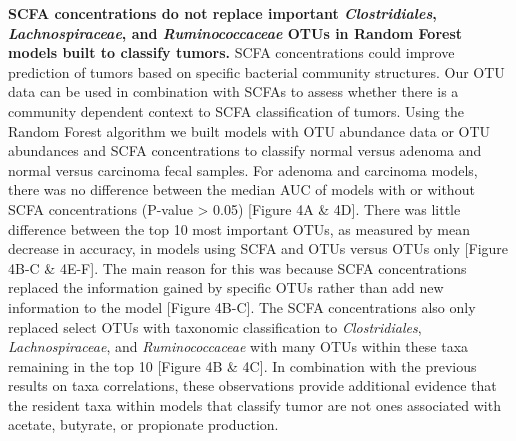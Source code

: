 \documentclass[11pt,]{article}
\begin{document}
\textbf{SCFA concentrations do not replace important
\emph{Clostridiales}, \emph{Lachnospiraceae}, and \emph{Ruminococcaceae}
OTUs in Random Forest models built to classify tumors.} SCFA
concentrations could improve prediction of tumors based on specific
bacterial community structures. Our OTU data can be used in combination
with SCFAs to assess whether there is a community dependent context to
SCFA classification of tumors. Using the Random Forest algorithm we
built models with OTU abundance data or OTU abundances and SCFA
concentrations to classify normal versus adenoma and normal versus
carcinoma fecal samples. For adenoma and carcinoma models, there was no
difference between the median AUC of models with or without SCFA
concentrations (P-value \textgreater{} 0.05) {[}Figure 4A \& 4D{]}.
There was little difference between the top 10 most important OTUs, as
measured by mean decrease in accuracy, in models using SCFA and OTUs
versus OTUs only {[}Figure 4B-C \& 4E-F{]}. The main reason for this was
because SCFA concentrations replaced the information gained by specific
OTUs rather than add new information to the model {[}Figure 4B-C{]}. The
SCFA concentrations also only replaced select OTUs with taxonomic
classification to \emph{Clostridiales}, \emph{Lachnospiraceae}, and
\emph{Ruminococcaceae} with many OTUs within these taxa remaining in the
top 10 {[}Figure 4B \& 4C{]}. In combination with the previous results
on taxa correlations, these observations provide additional evidence
that the resident taxa within models that classify tumor are not ones
associated with acetate, butyrate, or propionate production.
\end{document}
